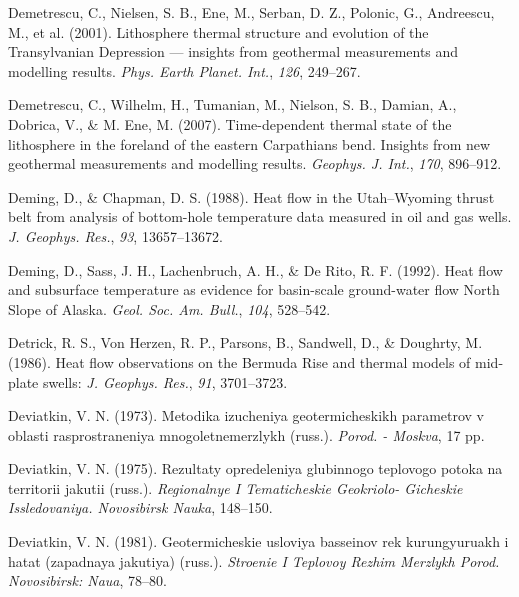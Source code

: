 \begin{CSLReferences}{1}{1}
\leavevmode{}%
Demetrescu, C., Nielsen, S. B., Ene, M., Serban, D. Z., Polonic, G., Andreescu, M., et al. (2001). Lithosphere thermal structure and evolution of the {Transylvanian Depression} --- insights from geothermal measurements and modelling results. \emph{Phys. Earth Planet. Int.}, \emph{126}, 249--267.

\leavevmode{}%
Demetrescu, C., Wilhelm, H., Tumanian, M., Nielson, S. B., Damian, A., Dobrica, V., \& M. Ene, M. (2007). Time-dependent thermal state of the lithosphere in the foreland of the eastern {Carpathians} bend. Insights from new geothermal measurements and modelling results. \emph{Geophys. J. Int.}, \emph{170}, 896--912.

\leavevmode{}%
Deming, D., \& Chapman, D. S. (1988). Heat flow in the {Utah--Wyoming} thrust belt from analysis of bottom-hole temperature data measured in oil and gas wells. \emph{J. Geophys. Res.}, \emph{93}, 13657--13672.

\leavevmode{}%
Deming, D., Sass, J. H., Lachenbruch, A. H., \& De Rito, R. F. (1992). Heat flow and subsurface temperature as evidence for basin-scale ground-water flow {North Slope of Alaska}. \emph{Geol. Soc. Am. Bull.}, \emph{104}, 528--542.

\leavevmode{}%
Detrick, R. S., Von Herzen, R. P., Parsons, B., Sandwell, D., \& Doughrty, M. (1986). Heat flow observations on the {Bermuda Rise} and thermal models of mid-plate swells: \emph{J. Geophys. Res.}, \emph{91}, 3701--3723.

\leavevmode{}%
Deviatkin, V. N. (1973). Metodika izucheniya geotermicheskikh parametrov v oblasti rasprostraneniya mnogoletnemerzlykh (russ.). \emph{Porod. - Moskva}, 17 pp.

\leavevmode{}%
Deviatkin, V. N. (1975). Rezultaty opredeleniya glubinnogo teplovogo potoka na territorii jakutii (russ.). \emph{Regionalnye I Tematicheskie Geokriolo- Gicheskie Issledovaniya. Novosibirsk Nauka}, 148--150.

\leavevmode{}%
Deviatkin, V. N. (1981). Geotermicheskie usloviya basseinov rek kurungyuruakh i hatat (zapadnaya jakutiya) (russ.). \emph{Stroenie I Teplovoy Rezhim Merzlykh Porod. Novosibirsk: Naua}, 78--80.


\end{CSLReferences}
